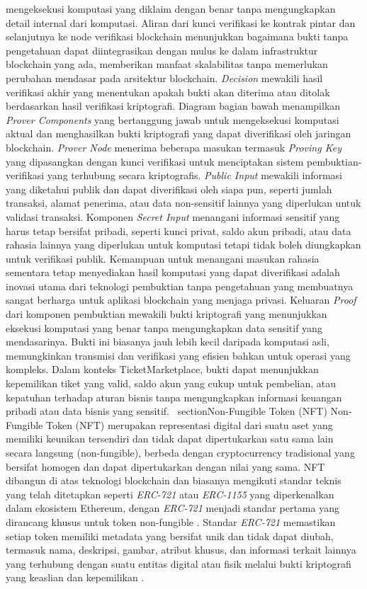 mengeksekusi komputasi yang diklaim dengan benar tanpa mengungkapkan detail
internal dari komputasi. Aliran dari kunci verifikasi ke kontrak pintar dan
selanjutnya ke node verifikasi blockchain menunjukkan bagaimana bukti tanpa
pengetahuan dapat diintegrasikan dengan mulus ke dalam infrastruktur blockchain
yang ada, memberikan manfaat skalabilitas tanpa memerlukan perubahan mendasar
pada arsitektur blockchain. \emph{Decision} mewakili hasil verifikasi akhir
yang menentukan apakah bukti akan diterima atau ditolak berdasarkan hasil
verifikasi kriptografi. Diagram bagian bawah menampilkan \emph{Prover Components}
yang bertanggung jawab untuk mengeksekusi komputasi aktual dan menghasilkan
bukti kriptografi yang dapat diverifikasi oleh jaringan blockchain. \emph{Prover Node} menerima beberapa masukan termasuk \emph{Proving Key} yang
dipasangkan dengan kunci verifikasi untuk menciptakan sistem
pembuktian-verifikasi yang terhubung secara kriptografis. \emph{Public Input}
mewakili informasi yang diketahui publik dan dapat diverifikasi oleh siapa pun,
seperti jumlah transaksi, alamat penerima, atau data non-sensitif lainnya yang
diperlukan untuk validasi transaksi. Komponen \emph{Secret Input} menangani
informasi sensitif yang harus tetap bersifat pribadi, seperti kunci privat,
saldo akun pribadi, atau data rahasia lainnya yang diperlukan untuk komputasi
tetapi tidak boleh diungkapkan untuk verifikasi publik. Kemampuan untuk
menangani masukan rahasia sementara tetap menyediakan hasil komputasi yang
dapat diverifikasi adalah inovasi utama dari teknologi pembuktian tanpa
pengetahuan yang membuatnya sangat berharga untuk aplikasi blockchain yang
menjaga privasi. Keluaran \emph{Proof} dari komponen pembuktian mewakili bukti
kriptografi yang menunjukkan eksekusi komputasi yang benar tanpa mengungkapkan
data sensitif yang mendasarinya. Bukti ini biasanya jauh lebih kecil daripada
komputasi asli, memungkinkan transmisi dan verifikasi yang efisien bahkan untuk
operasi yang kompleks. Dalam konteks TicketMarketplace, bukti dapat menunjukkan
kepemilikan tiket yang valid, saldo akun yang cukup untuk pembelian, atau
kepatuhan terhadap aturan bisnis tanpa mengungkapkan informasi keuangan pribadi
atau data bisnis yang sensitif.
\
section{Non-Fungible Token (NFT)}
\label{sec:nft}
Non-Fungible Token (NFT) merupakan representasi digital dari suatu aset yang memiliki keunikan tersendiri dan tidak dapat dipertukarkan satu sama lain secara langsung (non-fungible), berbeda dengan cryptocurrency tradisional yang bersifat homogen dan dapat dipertukarkan dengan nilai yang sama. NFT dibangun di atas teknologi blockchain dan biasanya mengikuti standar teknis yang telah ditetapkan seperti \emph{ERC-721} atau \emph{ERC-1155} yang diperkenalkan dalam ekosistem Ethereum, dengan \emph{ERC-721} menjadi standar pertama yang dirancang khusus untuk token non-fungible \parencite{Entriken2018}. Standar \emph{ERC-721} memastikan setiap token memiliki metadata yang bersifat unik dan tidak dapat diubah, termasuk nama, deskripsi, gambar, atribut khusus, dan informasi terkait lainnya yang terhubung dengan suatu entitas digital atau fisik melalui bukti kriptografi yang keaslian dan kepemilikan \parencite{Wang2021}.
